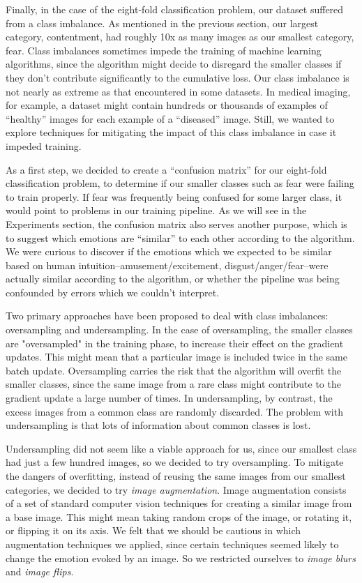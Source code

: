\documentclass[10pt,twocolumn,letterpaper]{article}
\begin{document}
Finally, in the case of the eight-fold classification problem, our dataset suffered from a class imbalance. As mentioned in the previous section, our largest category, contentment, had roughly 10x as many images as our smallest category, fear. Class imbalances sometimes impede the training of machine learning algorithms, since the algorithm might decide to disregard the smaller classes if they don't contribute significantly to the cumulative loss. Our class imbalance is not nearly as extreme as that encountered in some datasets. In medical imaging, for example, a dataset might contain hundreds or thousands of examples of ``healthy'' images for each example of a ``diseased'' image. Still, we wanted to explore techniques for mitigating the impact of this class imbalance in case it impeded training.

As a first step, we decided to create a ``confusion matrix'' for our eight-fold classification problem, to determine if our smaller classes such as fear were failing to train properly. If fear was frequently being confused for some larger class, it would point to problems in our training pipeline. As we will see in the Experiments section, the confusion matrix also serves another purpose, which is to suggest which emotions are ``similar'' to each other according to the algorithm. We were curious to discover if the emotions which we expected to be similar based on human intuition--amusement/excitement, disgust/anger/fear--were actually similar according to the algorithm, or whether the pipeline was being confounded by errors which we couldn't interpret.

Two primary approaches have been proposed to deal with class imbalances: oversampling and undersampling\cite{classimbalance}. In the case of oversampling, the smaller classes are "oversampled" in the training phase, to increase their effect on the gradient updates. This might mean that a particular image is included twice in the same batch update. Oversampling carries the risk that the algorithm will overfit the smaller classes, since the same image from a rare class might contribute to the gradient update a large number of times. In undersampling, by contrast, the excess images from a common class are randomly discarded. The problem with undersampling is that lots of information about common classes is lost.

Undersampling did not seem like a viable approach for us, since our smallest class had just a few hundred images, so we decided to try oversampling. To mitigate the dangers of overfitting, instead of reusing the same images from our smallest categories, we decided to try \textit{image augmentation}. Image augmentation consists of a set of standard computer vision techniques for creating a similar image from a base image. This might mean taking random crops of the image, or rotating it, or flipping it on its axis. We felt that we should be cautious in which augmentation techniques we applied, since certain techniques seemed likely to change the emotion evoked by an image. So we restricted ourselves to \textit{image blurs} and \textit{image flips}. 
\end{document}
